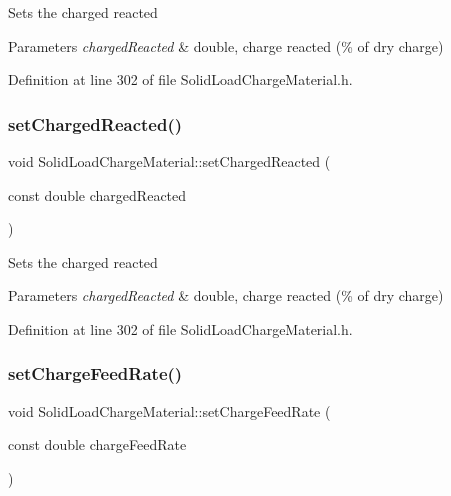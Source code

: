 Sets the charged reacted 
\begin{DoxyParams}{Parameters}
{\em charged\+Reacted} & double, charge reacted (\% of dry charge) \\
\hline
\end{DoxyParams}


Definition at line 302 of file Solid\+Load\+Charge\+Material.\+h.

\mbox{\label{class_solid_load_charge_material_a38f3b832ff29f779a78a51fd7352fcd4}} 
\subsubsection{\texorpdfstring{set\+Charged\+Reacted()}{setChargedReacted()}\hspace{0.1cm}{\footnotesize\ttfamily [3/3]}}
{\footnotesize\ttfamily void Solid\+Load\+Charge\+Material\+::set\+Charged\+Reacted (\begin{DoxyParamCaption}\item[{const double}]{charged\+Reacted }\end{DoxyParamCaption})\hspace{0.3cm}{\ttfamily [inline]}}

Sets the charged reacted 
\begin{DoxyParams}{Parameters}
{\em charged\+Reacted} & double, charge reacted (\% of dry charge) \\
\hline
\end{DoxyParams}


Definition at line 302 of file Solid\+Load\+Charge\+Material.\+h.

\mbox{\label{class_solid_load_charge_material_adc50117256b714789f68097437ca658d}} 
\subsubsection{\texorpdfstring{set\+Charge\+Feed\+Rate()}{setChargeFeedRate()}\hspace{0.1cm}{\footnotesize\ttfamily [1/3]}}
{\footnotesize\ttfamily void Solid\+Load\+Charge\+Material\+::set\+Charge\+Feed\+Rate (\begin{DoxyParamCaption}\item[{const double}]{charge\+Feed\+Rate }\end{DoxyParamCaption})\hspace{0.3cm}{\ttfamily [inline]}}

